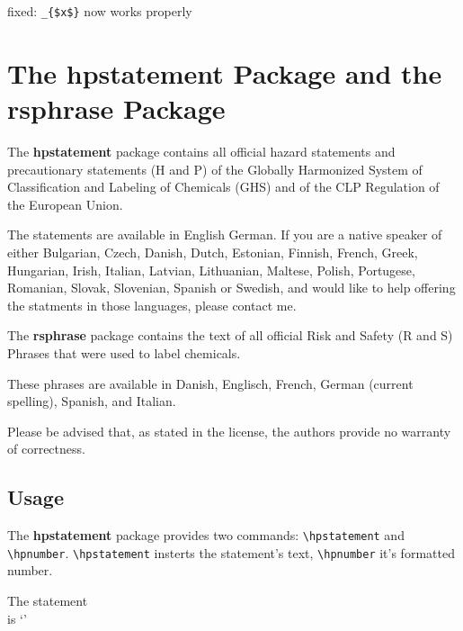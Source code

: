 \documentclass[a4paper,notitlepage]{scrreprt}
\begin{document}
\begin{compactitem}
  \item fixed: \verb|_{$x$}| now works properly
\end{compactitem}



\chapter{The hpstatement Package and the rsphrase Package}\label{sec:rsphrase}

The \textbf{hpstatement} package contains all official
hazard statements and precautionary statements (H and P) of the
Globally Harmonized System of Classification and Labeling of Chemicals (GHS)
and of the CLP Regulation of the European Union. 

The statements are available in 
  English
  German.
If you are a native speaker of either
Bulgarian,
Czech,
Danish,
Dutch,
Estonian,
Finnish,
French,
Greek,
Hungarian,
Irish,
Italian,
Latvian,
Lithuanian,
Maltese,
Polish,
Portugese,
Romanian,
Slovak,
Slovenian,
Spanish or
Swedish,
and would like to help offering the statments in those languages, please contact me.

\bigskip

The \textbf{rsphrase} package contains the text of all official
Risk and Safety (R and S) Phrases that were used to label chemicals.

These phrases are
available in Danish, Englisch, French, German (current spelling), Spanish, and Italian.

\bigskip

Please be advised that, as stated in the license, the authors provide no warranty of correctness.
    

\section{Usage}

The \textbf{hpstatement} package provides two commands: \verb|\hpstatement| and
\verb|\hpnumber|. \verb|\hpstatement| insterts the statement's text,
\verb|\hpnumber| it's formatted number.\bigskip

\begin{addmargin}[1em]{0em}
\begin{SideBySideExample}[xrightmargin=7cm]
  The statement \\
  is `'
\end{SideBySideExample}
\end{addmargin}
\bigskip
\end{document}
